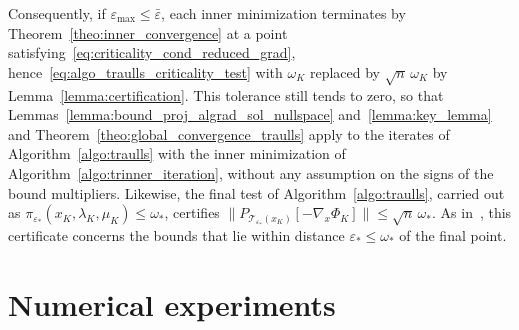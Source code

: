 \documentclass{article}
\numberwithin{equation}{section}
\newcommand{\calT}{{\mathcal{T}}}
\newcommand{\proj}[2]{P_{#1} \left[ {#2} \right]} %
\theoremstyle{plain}
\begin{document}
Consequently, if $\varepsilon_{\max} \le \bar\varepsilon$, each inner minimization terminates by Theorem~\ref{theo:inner_convergence} at a point satisfying~\eqref{eq:criticality_cond_reduced_grad}, hence~\eqref{eq:algo_traulls_criticality_test} with $\omega_K$ replaced by $\sqrt{n}\,\omega_K$ by Lemma~\ref{lemma:certification}. This tolerance still tends to zero, so that Lemmas~\ref{lemma:bound_proj_algrad_sol_nullspace} and~\ref{lemma:key_lemma} and Theorem~\ref{theo:global_convergence_traulls} apply to the iterates of Algorithm~\ref{algo:traulls} with the inner minimization of Algorithm~\ref{algo:trinner_iteration}, without any assumption on the signs of the bound multipliers. Likewise, the final test of Algorithm~\ref{algo:traulls}, carried out as $\pi_{\varepsilon_*}(x_K,\lambda_K,\mu_K) \le \omega_*$, certifies $\|\proj{\calT_{\varepsilon_*}(x_K)}{-\nabla_x\Phi_K}\| \le \sqrt{n}\,\omega_*$. As in~\cite{conn-etal:1996b}, this certificate concerns the bounds that lie within distance $\varepsilon_* \le \omega_*$ of the final point.

	\section{Numerical experiments}\label{sec:numerical_experiments}
\end{document}
